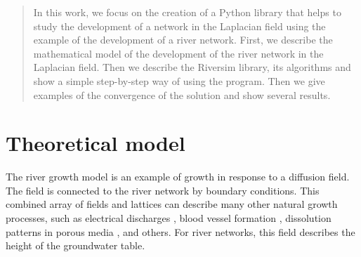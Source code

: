 \documentclass[]{pracamgr}
\begin{document}
\begin{abstract}
    In this work, we focus on the creation of a Python library that helps to study the development of a network in the Laplacian field using the example of the development of a river network. First, we describe the mathematical model of the development of the river network in the Laplacian field. Then we describe the Riversim library, its algorithms and show a simple step-by-step way of using the program. Then we give examples of the convergence of the solution and show several results.\par

  \end{abstract}

  \tableofcontents

  \chapter{Theoretical model}
    
    The river growth model is an example of growth in response to a diffusion field. The field is connected to the river network by boundary conditions. This combined array of fields and lattices can describe many other natural growth processes, such as electrical discharges \cite{niemeyer1984fractal}, blood vessel formation \cite{nguyen2006dynamics}, dissolution patterns in porous media \cite{szymczak2011initial}, and others. For river networks, this field describes the height of the groundwater table.
\end{document}
